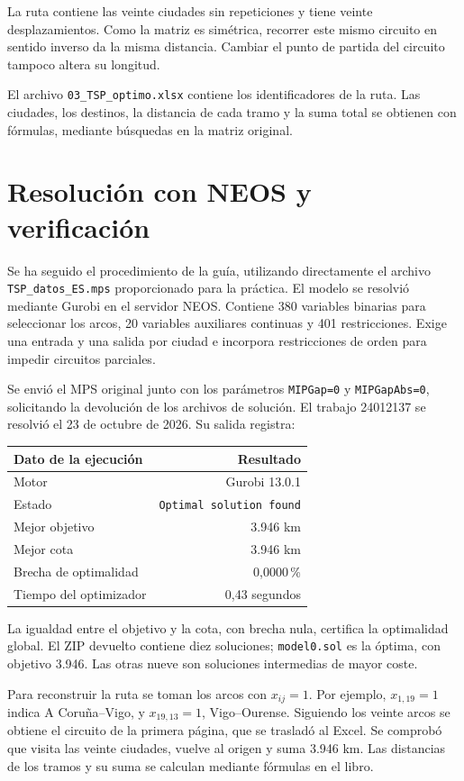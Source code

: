 \documentclass[11pt,a4paper]{article}
\begin{document}
La ruta contiene las veinte ciudades sin repeticiones y tiene veinte desplazamientos.
Como la matriz es simétrica, recorrer este mismo circuito en sentido inverso da la misma
distancia. Cambiar el punto de partida del circuito tampoco altera su longitud.

El archivo \texttt{03\_TSP\_optimo.xlsx} contiene los identificadores de la ruta.
Las ciudades, los destinos, la distancia de cada tramo y la suma total se obtienen con
fórmulas, mediante búsquedas en la matriz original.

\newpage
\section*{Resolución con NEOS y verificación}
Se ha seguido el procedimiento de la guía, utilizando directamente el archivo
\texttt{TSP\_datos\_ES.mps} proporcionado para la práctica. El modelo se resolvió mediante
Gurobi en el servidor NEOS. Contiene 380 variables binarias para seleccionar los arcos,
20 variables auxiliares continuas y 401 restricciones. Exige una entrada y una salida
por ciudad e incorpora restricciones de orden para impedir circuitos parciales.

Se envió el MPS original junto con los parámetros \texttt{MIPGap=0} y
\texttt{MIPGapAbs=0}, solicitando la devolución de los archivos de solución.
El trabajo 24012137 se resolvió el 23 de octubre de 2026. Su salida registra:

\begin{center}\begin{tabular}{lr}\toprule
Dato de la ejecución & Resultado \\\midrule
Motor & Gurobi 13.0.1 \\
Estado & \texttt{Optimal solution found} \\
Mejor objetivo & 3.946 km \\
Mejor cota & 3.946 km \\
Brecha de optimalidad & 0,0000\,\% \\
Tiempo del optimizador & 0,43 segundos \\
\bottomrule\end{tabular}\end{center}

La igualdad entre el objetivo y la cota, con brecha nula, certifica la optimalidad global.
El ZIP devuelto contiene diez soluciones; \texttt{model0.sol} es la óptima, con objetivo
3.946. Las otras nueve son soluciones intermedias de mayor coste.

Para reconstruir la ruta se toman los arcos con $x_{ij}=1$. Por ejemplo,
$x_{1,19}=1$ indica A Coruña--Vigo, y $x_{19,13}=1$, Vigo--Ourense.
Siguiendo los veinte arcos se obtiene el circuito de la primera página, que se trasladó
al Excel. Se comprobó que visita las veinte ciudades, vuelve al origen y suma 3.946 km.
Las distancias de los tramos y su suma se calculan mediante fórmulas en el libro.
\end{document}
